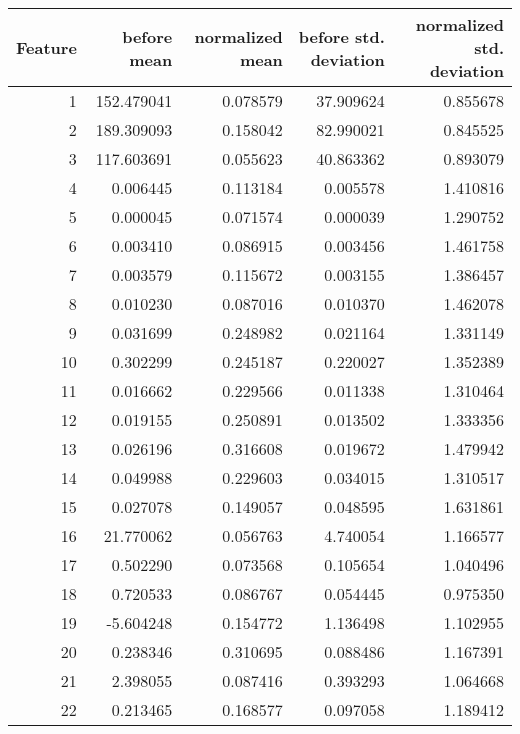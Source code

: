 \begin{tabular}{rrrrr}
\toprule
 Feature &  before mean &  normalized mean &  before std. deviation &  normalized std. deviation \\
\midrule
       1 &   152.479041 &         0.078579 &              37.909624 &                   0.855678 \\
       2 &   189.309093 &         0.158042 &              82.990021 &                   0.845525 \\
       3 &   117.603691 &         0.055623 &              40.863362 &                   0.893079 \\
       4 &     0.006445 &         0.113184 &               0.005578 &                   1.410816 \\
       5 &     0.000045 &         0.071574 &               0.000039 &                   1.290752 \\
       6 &     0.003410 &         0.086915 &               0.003456 &                   1.461758 \\
       7 &     0.003579 &         0.115672 &               0.003155 &                   1.386457 \\
       8 &     0.010230 &         0.087016 &               0.010370 &                   1.462078 \\
       9 &     0.031699 &         0.248982 &               0.021164 &                   1.331149 \\
      10 &     0.302299 &         0.245187 &               0.220027 &                   1.352389 \\
      11 &     0.016662 &         0.229566 &               0.011338 &                   1.310464 \\
      12 &     0.019155 &         0.250891 &               0.013502 &                   1.333356 \\
      13 &     0.026196 &         0.316608 &               0.019672 &                   1.479942 \\
      14 &     0.049988 &         0.229603 &               0.034015 &                   1.310517 \\
      15 &     0.027078 &         0.149057 &               0.048595 &                   1.631861 \\
      16 &    21.770062 &         0.056763 &               4.740054 &                   1.166577 \\
      17 &     0.502290 &         0.073568 &               0.105654 &                   1.040496 \\
      18 &     0.720533 &         0.086767 &               0.054445 &                   0.975350 \\
      19 &    -5.604248 &         0.154772 &               1.136498 &                   1.102955 \\
      20 &     0.238346 &         0.310695 &               0.088486 &                   1.167391 \\
      21 &     2.398055 &         0.087416 &               0.393293 &                   1.064668 \\
      22 &     0.213465 &         0.168577 &               0.097058 &                   1.189412 \\
\bottomrule
\end{tabular}
